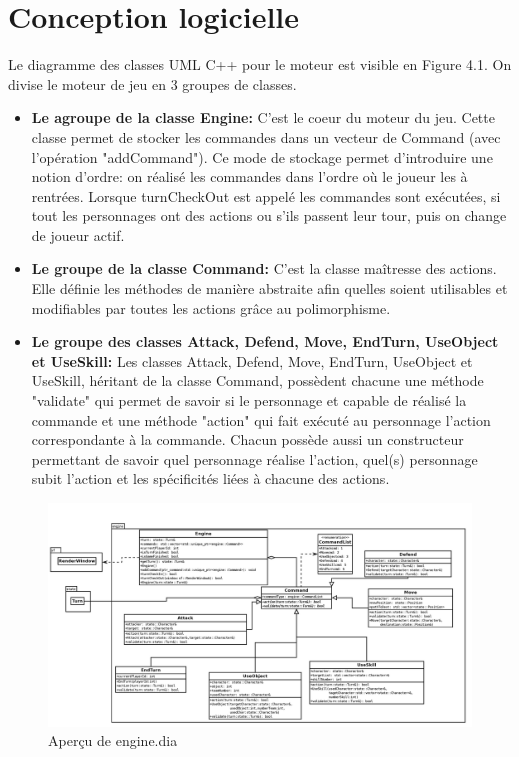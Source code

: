 \section{Conception logicielle}
Le diagramme des classes UML C++ pour le moteur est visible en Figure 4.1.
On divise le moteur de jeu en 3 groupes de classes.
\begin{itemize}
    \item \textbf{Le agroupe de la classe Engine:} C’est le coeur du moteur du jeu. 
    Cette classe permet de stocker les commandes dans un vecteur de Command (avec l'opération "addCommand"). 
    Ce mode de stockage permet d’introduire une notion d'ordre: on réalisé les commandes dans 
    l'ordre où le joueur les à rentrées. Lorsque turnCheckOut est appelé les commandes sont exécutées, 
    si tout les personnages ont des actions ou s'ils passent leur tour, puis on change de joueur actif.
    \\
    \item \textbf{Le groupe de la classe Command:} C'est la classe maîtresse des actions. 
    Elle définie les méthodes de manière abstraite afin quelles soient utilisables et 
    modifiables par toutes les actions grâce au polimorphisme.
    \\
    \item \textbf{Le groupe des classes Attack, Defend, Move, EndTurn, UseObject et UseSkill:} 
    Les classes Attack, Defend, Move, EndTurn, UseObject et UseSkill, héritant de la classe
    Command, possèdent chacune une méthode "validate" qui permet de savoir si le personnage et 
    capable de réalisé la commande et une méthode "action" qui fait exécuté au personnage 
    l’action correspondante à la commande. Chacun possède aussi un constructeur permettant de 
    savoir quel personnage réalise l'action, quel(s) personnage subit l'action et les spécificités 
    liées à chacune des actions.
\end{itemize}



\begin{figure}[H]
\includegraphics[width=\linewidth]{images/engine_dia.png}
\centering
\caption{Aperçu de engine.dia}
\label{fig:img3}
\end{figure}
